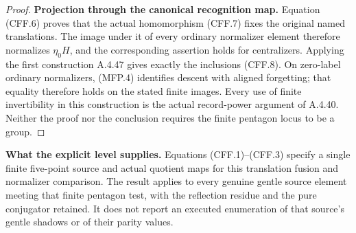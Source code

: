 \begin{proof}
\par\medskip\noindent\textbf{Projection through the canonical recognition map.}\quad
Equation (CFF.6) proves that the actual homomorphism (CFF.7)
fixes the original named translations.  The image under it of
every ordinary normalizer element therefore normalizes
$\eta_0 H$, and the corresponding assertion holds for
centralizers.  Applying the first construction A.4.47 gives
exactly the inclusions (CFF.8).  On zero-label ordinary
normalizers, (MFP.4) identifies descent with aligned forgetting;
that equality therefore holds on the stated finite images.
Every use of finite invertibility in this construction is the
actual record-power argument of A.4.40.  Neither the proof nor
the conclusion requires the finite pentagon locus to be a group.
\end{proof}

\par\medskip\noindent\textbf{What the explicit level supplies.}\quad
Equations (CFF.1)--(CFF.3) specify a single finite five-point
source and actual quotient maps for this translation fusion and
normalizer comparison.  The result applies to every genuine
gentle source element meeting that finite pentagon test, with
the reflection residue and the pure conjugator retained.
It does not report an executed enumeration of that source's
gentle shadows or of their parity values.
